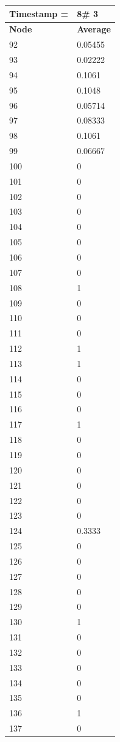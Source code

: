 \begin{tabular}{|l||l|}
\hline
\textbf{Timestamp =} & \textbf{8}\# 3\\\hline
	\textbf{Node} & \textbf{Average} \\ \hline
\hline
	92 & 0.05455 \\ \hline
	93 & 0.02222 \\ \hline
	94 & 0.1061 \\ \hline
	95 & 0.1048 \\ \hline
	96 & 0.05714 \\ \hline
	97 & 0.08333 \\ \hline
	98 & 0.1061 \\ \hline
	99 & 0.06667 \\ \hline
	100 & 0 \\ \hline
	101 & 0 \\ \hline
	102 & 0 \\ \hline
	103 & 0 \\ \hline
	104 & 0 \\ \hline
	105 & 0 \\ \hline
	106 & 0 \\ \hline
	107 & 0 \\ \hline
	108 & 1 \\ \hline
	109 & 0 \\ \hline
	110 & 0 \\ \hline
	111 & 0 \\ \hline
	112 & 1 \\ \hline
	113 & 1 \\ \hline
	114 & 0 \\ \hline
	115 & 0 \\ \hline
	116 & 0 \\ \hline
	117 & 1 \\ \hline
	118 & 0 \\ \hline
	119 & 0 \\ \hline
	120 & 0 \\ \hline
	121 & 0 \\ \hline
	122 & 0 \\ \hline
	123 & 0 \\ \hline
	124 & 0.3333 \\ \hline
	125 & 0 \\ \hline
	126 & 0 \\ \hline
	127 & 0 \\ \hline
	128 & 0 \\ \hline
	129 & 0 \\ \hline
	130 & 1 \\ \hline
	131 & 0 \\ \hline
	132 & 0 \\ \hline
	133 & 0 \\ \hline
	134 & 0 \\ \hline
	135 & 0 \\ \hline
	136 & 1 \\ \hline
	137 & 0 \\ \hline
\end{tabular}

